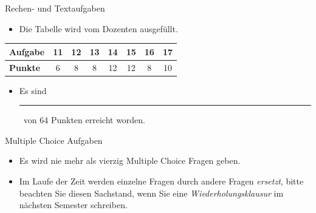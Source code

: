 \documentclass[a4paper, 10pt]{scrartcl}\usepackage[]{graphicx}\usepackage[]{xcolor}
\begin{document}
\begin{graybox}{Rechen- und Textaufgaben}
  \begin{itemize}
  \item Die Tabelle wird vom Dozenten ausgefüllt.
  \end{itemize}
  \begin{center}
    \large
    \begin{tabular}{|l|c|c|c|c|c|c|c|}
      \hline
      \textbf{Aufgabe} & 11 & 12 & 13 & 14 & 15 & 16 & 17 \strut\\
      \hline
      \textbf{Punkte} & 
      \hspace{1Ex}\Large\textcolor{gray!70}{6}\hspace{1Ex}  & 
      \hspace{1Ex}\Large\textcolor{gray!70}{8}\hspace{1Ex}  & 
      \hspace{1Ex}\Large\textcolor{gray!70}{8}\hspace{1Ex}  & 
      \hspace{1Ex}\Large\textcolor{gray!70}{12}\hspace{1Ex}  & 
      \hspace{1Ex}\Large\textcolor{gray!70}{12}\hspace{1Ex}  & 
      \hspace{1Ex}\Large\textcolor{gray!70}{8}\hspace{1Ex}  & 
      \hspace{1Ex}\Large\textcolor{gray!70}{10}\hspace{1Ex} \strut\\
      \hline
  \end{tabular}
\end{center}
\begin{itemize}
\item Es sind \rule[0ex]{2em}{.4pt}\, von 64 Punkten erreicht worden.
\end{itemize}
\end{graybox}

\clearpage
\begin{graybox}{Multiple Choice Aufgaben}
  \begin{itemize}
  \item Es wird nie mehr als vierzig Multiple Choice Fragen geben.
  \item Im Laufe der Zeit werden einzelne Fragen durch andere Fragen \textit{ersetzt}, bitte beachten Sie diesen Sachstand, wenn Sie eine \textit{Wiederholungsklausur} im nächsten Semester schreiben. 
  \end{itemize}
\end{graybox}
    
\end{document}
